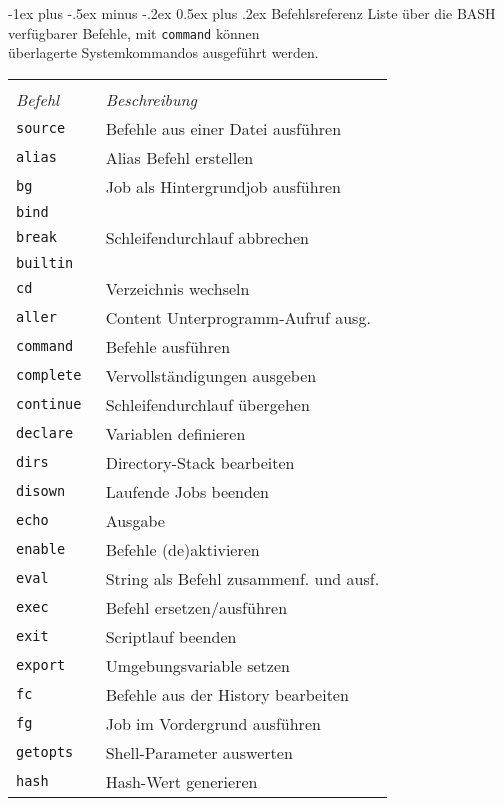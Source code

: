 \documentclass[landscape,letter,10pt]{article}
\makeatletter
\renewcommand{\section}{\@startsection{section}{1}{0mm}%
                                {-1ex plus -.5ex minus -.2ex}%
                                {0.5ex plus .2ex}%
                                {\normalfont\large\bfseries}}
\makeatother
\begin{document}
\begin{multicols}{3}
\section{Befehlsreferenz}
Liste über die BASH verfügbarer Befehle, mit \texttt{command} können \\ überlagerte Systemkommandos ausgeführt werden. \\
\begin{tabular}{@{}ll@{}}
& \\
\textit{Befehl} & \textit{Beschreibung} \\
\texttt{source } &  Befehle aus einer Datei ausführen \\
\texttt{alias } &  Alias Befehl erstellen \\
\texttt{bg } &  Job als Hintergrundjob ausführen \\
\texttt{bind } &   \\
\texttt{break } &  Schleifendurchlauf abbrechen \\
\texttt{builtin } &   \\
\texttt{cd } &  Verzeichnis wechseln \\
\texttt{aller } & Content Unterprogramm-Aufruf ausg. \\
\texttt{command } & Befehle ausführen  \\
\texttt{complete } & Vervollständigungen ausgeben  \\
\texttt{continue } & Schleifendurchlauf übergehen  \\
\texttt{declare } &  Variablen definieren \\
\texttt{dirs } &  Directory-Stack bearbeiten \\
\texttt{disown } &  Laufende Jobs beenden \\
\texttt{echo } &  Ausgabe \\
\texttt{enable } & Befehle (de)aktivieren  \\
\texttt{eval } &  String als Befehl zusammenf. und ausf. \\
\texttt{exec } &  Befehl ersetzen/ausführen \\
\texttt{exit } &  Scriptlauf beenden \\
\texttt{export } & Umgebungsvariable setzen  \\
\texttt{fc } & Befehle aus der History bearbeiten \\
\texttt{fg } & Job im Vordergrund ausführen  \\
\texttt{getopts } & Shell-Parameter auswerten  \\
\texttt{hash } & Hash-Wert generieren  \\

\end{tabular}
\end{multicols}
\end{document}
